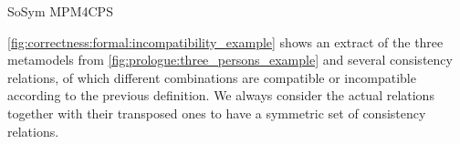 \begin{copiedFrom}{SoSym MPM4CPS}
\begin{example}
\autoref{fig:correctness:formal:incompatibility_example} shows an extract of the three metamodels from \autoref{fig:prologue:three_persons_example} and several consistency relations, of which different combinations are compatible or incompatible according to the previous definition.
We always consider the actual relations together with their transposed ones to have a symmetric set of consistency relations.




\end{example}
\end{copiedFrom}

